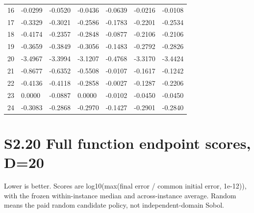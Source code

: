 \documentclass[11pt,a4paper]{article}
\begin{document}
\begin{minipage}{\linewidth}
\begin{longtable}[]{@{}lllllll@{}}
16 & -0.0299 & -0.0520 & -0.0436 & -0.0639 & -0.0216 & -0.0108 \\
17 & -0.3329 & -0.3021 & -0.2586 & -0.1783 & -0.2201 & -0.2534 \\
18 & -0.4174 & -0.2357 & -0.2848 & -0.0877 & -0.2106 & -0.2106 \\
19 & -0.3659 & -0.3849 & -0.3056 & -0.1483 & -0.2792 & -0.2826 \\
20 & -3.4967 & -3.3994 & -3.1207 & -0.4768 & -3.3170 & -3.4424 \\
21 & -0.8677 & -0.6352 & -0.5508 & -0.0107 & -0.1617 & -0.1242 \\
22 & -0.4136 & -0.4118 & -0.2858 & -0.0027 & -0.1287 & -0.2206 \\
23 & 0.0000 & -0.0887 & 0.0000 & -0.0102 & -0.0450 & -0.0450 \\
24 & -0.3083 & -0.2868 & -0.2970 & -0.1427 & -0.2901 & -0.2840 \\
\bottomrule
\end{longtable}

\end{minipage}\par

\newpage

\hypertarget{s2.20-full-function-endpoint-scores-d20}{%
\section{S2.20 Full function endpoint scores,
D=20}\label{s2.20-full-function-endpoint-scores-d20}}

Lower is better. Scores are log10(max(final error / common initial
error, 1e-12)), with the frozen within-instance median and
across-instance average. Random means the paid random candidate policy,
not independent-domain Sobol.
\end{document}

